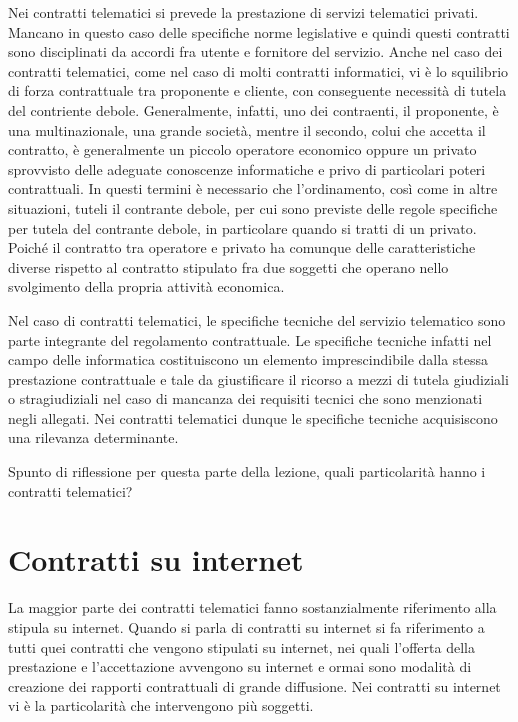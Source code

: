  Nei contratti telematici si prevede la prestazione di servizi telematici privati. Mancano in questo caso delle specifiche norme legislative e quindi questi contratti sono disciplinati da accordi fra utente e fornitore del servizio. Anche nel caso dei contratti telematici, come nel caso di molti contratti informatici, vi è lo squilibrio di forza contrattuale tra proponente e cliente, con conseguente necessità di tutela del contriente debole. Generalmente, infatti, uno dei contraenti, il proponente, è una multinazionale, una grande società, mentre il secondo, colui che accetta il contratto, è generalmente un piccolo operatore economico oppure un privato sprovvisto delle adeguate conoscenze informatiche e privo di particolari poteri contrattuali. In questi termini è necessario che l'ordinamento, così come in altre situazioni, tuteli il contrante debole, per cui sono previste delle regole specifiche per tutela del contrante debole, in particolare quando si tratti di un privato. Poiché il contratto tra operatore e privato ha comunque delle caratteristiche diverse rispetto al contratto stipulato fra due soggetti che operano nello svolgimento della propria attività economica.
 
 Nel caso di contratti telematici, le specifiche tecniche del servizio telematico sono parte integrante del regolamento contrattuale. Le specifiche tecniche infatti nel campo delle informatica costituiscono un elemento imprescindibile dalla stessa prestazione contrattuale e tale da giustificare il ricorso a mezzi di tutela giudiziali o stragiudiziali nel caso di mancanza dei requisiti tecnici che sono menzionati negli allegati. Nei contratti telematici dunque le specifiche tecniche acquisiscono una rilevanza determinante. 
 
 Spunto di riflessione per questa parte della lezione, quali particolarità hanno i contratti telematici? 
 
 \section{Contratti su internet}
 La maggior parte dei contratti telematici fanno sostanzialmente riferimento alla stipula su internet. Quando si parla di contratti su internet si fa riferimento a tutti quei contratti che vengono stipulati su internet, nei quali l'offerta della prestazione e l'accettazione avvengono su internet e ormai sono modalità di creazione dei rapporti contrattuali di grande diffusione. 
 Nei contratti su internet vi è la particolarità che intervengono più soggetti. 
 
